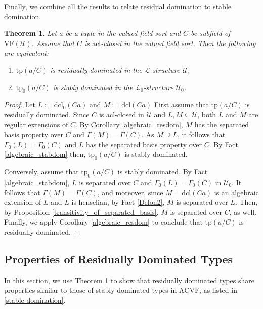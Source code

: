 \documentclass[12pt]{article}
\newcommand{\tpp}{\mathrm{tp}}
\newcommand{\ACVF}{\mathrm{ACVF}}
\newcommand{\acl}{\mathrm{acl}}
\newcommand{\dcl}{\mathrm{dcl}}
\newcommand{\0}{\emptyset}
\newcommand{\vf}{\mathrm{VF}}
\newcommand{\U}{\mathcal{U}}
\newcommand{\Ualg}{\mathcal{U}_0}
\theoremstyle{plain}%
\newtheorem{thm}{Theorem}[section]
\theoremstyle{definition}
\theoremstyle{remark}
\begin{document}
Finally, we combine all the results to relate residual domination to stable domination.

\begin{thm}\label{stabdom_eqv_resdom} Let $a$ be a tuple in the valued field sort and $C$ be subfield of $\vf(\U)$. Assume that $C$ is $\acl$-closed in the valued field sort. Then the following are equivalent:
\begin{enumerate}
    \item $\tpp(a/C)$ is residually dominated in the $\mathcal{L}$-structure $\U$,
    \item $\tpp_0(a/C)$ is stably dominated in the $\mathcal{L}_0$-structure $\Ualg$.
\end{enumerate}
\end{thm}

\begin{proof}
    Let $L:= \dcl_0(Ca)$ and $M:=\dcl(Ca)$ First assume that $\tpp(a/C)$ is residually dominated. Since $C$ is $\acl$-closed in $\U$ and $L,M\subseteq \U$, both $L$ and $M$ are regular extensions of $C$. By Corollary \ref{algebraic_resdom}, $M$ has the separated basis property over $C$ and $\Gamma(M)=\Gamma(C)$. As $M\supseteq L$, it follows that $\Gamma_0(L)=\Gamma_0(C)$ and $L$ has the separated basis property over $C$. By Fact \ref{algebraic_stabdom} then, $\tpp_0(a/C)$ is stably dominated.

Conversely, assume that $\tpp_0(a/C)$ is stably dominated. By Fact \ref{algebraic_stabdom}, $L$ is separated over $C$ and $\Gamma_0(L)=\Gamma_0(C)$ in $\Ualg$. It follows that $\Gamma(M)=\Gamma(C)$, and moreover, since $M=\dcl(Ca)$ is an algebraic extension of $L$ and $L$ is henselian, by Fact \ref{Delon2}, $M$ is separated over $L$. Then, by Proposition \ref{transitivity_of_separated_basis}, $M$ is separated over $C$, as well. %
Finally, we apply  Corollary \ref{algebraic_resdom} to conclude that $\tpp(a/C)$ is residually dominated. \end{proof}



\subsection{Properties of Residually Dominated Types}\label{sec_prop_resdom}
In this section, we use Theorem \ref{stabdom_eqv_resdom} to show that residually dominated types share properties similar to those of stably dominated types in $\ACVF$, as listed in \ref{stable domination}.
\end{document}

